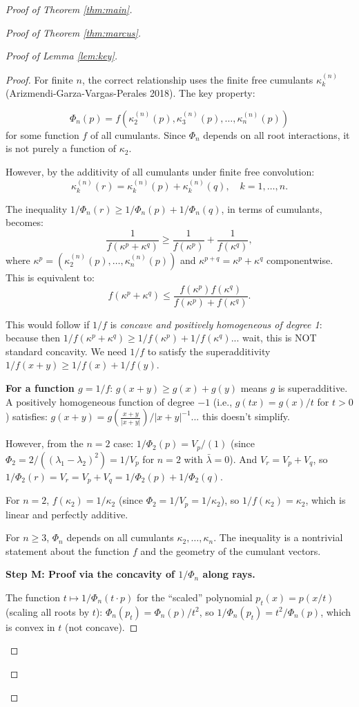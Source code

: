 \documentclass[12pt]{article}
\theoremstyle{definition}
\begin{document}
\begin{proof}[Proof of Theorem \ref{thm:main}]
\begin{proof}[Proof of Theorem \ref{thm:marcus}]
\begin{proof}[Proof of Lemma \ref{lem:key}]
\begin{proof}
For finite $n$, the correct relationship uses the finite free cumulants $\kappa_k^{(n)}$ (Arizmendi-Garza-Vargas-Perales 2018). The key property:

\begin{equation}\label{eq:cumulant-phi}
\Phi_n(p) = f(\kappa_2^{(n)}(p), \kappa_3^{(n)}(p), \ldots, \kappa_n^{(n)}(p))
\end{equation}
for some function $f$ of all cumulants. Since $\Phi_n$ depends on all root interactions, it is not purely a function of $\kappa_2$.

However, by the additivity of all cumulants under finite free convolution:
$$\kappa_k^{(n)}(r) = \kappa_k^{(n)}(p)+\kappa_k^{(n)}(q), \quad k=1,\ldots,n.$$

The inequality $1/\Phi_n(r)\geq 1/\Phi_n(p)+1/\Phi_n(q)$, in terms of cumulants, becomes:
$$\frac{1}{f(\kappa^p+\kappa^q)}\geq\frac{1}{f(\kappa^p)}+\frac{1}{f(\kappa^q)},$$
where $\kappa^p = (\kappa_2^{(n)}(p),\ldots,\kappa_n^{(n)}(p))$ and $\kappa^{p+q} = \kappa^p+\kappa^q$ componentwise. This is equivalent to:
$$f(\kappa^p+\kappa^q)\leq\frac{f(\kappa^p)f(\kappa^q)}{f(\kappa^p)+f(\kappa^q)}.$$

This would follow if $1/f$ is \emph{concave and positively homogeneous of degree 1}: because then $1/f(\kappa^p+\kappa^q)\geq 1/f(\kappa^p)+1/f(\kappa^q)$... wait, this is NOT standard concavity. We need $1/f$ to satisfy the superadditivity $1/f(x+y)\geq 1/f(x)+1/f(y)$.

\textbf{For a function $g = 1/f$}: $g(x+y)\geq g(x)+g(y)$ means $g$ is superadditive. A positively homogeneous function of degree $-1$ (i.e., $g(tx) = g(x)/t$ for $t>0$) satisfies: $g(x+y) = g(\frac{x+y}{|x+y|})/|x+y|^{-1}$... this doesn't simplify.

However, from the $n=2$ case: $1/\Phi_2(p) = V_p/(1)$ (since $\Phi_2 = 2/((\lambda_1-\lambda_2)^2) = 1/V_p$ for $n=2$ with $\bar\lambda=0$). And $V_r = V_p+V_q$, so $1/\Phi_2(r) = V_r = V_p+V_q = 1/\Phi_2(p)+1/\Phi_2(q)$.

For $n=2$, $f(\kappa_2) = 1/\kappa_2$ (since $\Phi_2 = 1/V_p = 1/\kappa_2$), so $1/f(\kappa_2) = \kappa_2$, which is linear and perfectly additive.

For $n\geq 3$, $\Phi_n$ depends on all cumulants $\kappa_2,\ldots,\kappa_n$. The inequality is a nontrivial statement about the function $f$ and the geometry of the cumulant vectors.

\textbf{Step M: Proof via the concavity of $1/\Phi_n$ along rays.}

The function $t\mapsto 1/\Phi_n(t\cdot p)$ for the ``scaled'' polynomial $p_t(x) = p(x/t)$ (scaling all roots by $t$): $\Phi_n(p_t) = \Phi_n(p)/t^2$, so $1/\Phi_n(p_t) = t^2/\Phi_n(p)$, which is convex in $t$ (not concave).


\end{proof}
\end{proof}
\end{proof}
\end{proof}
\end{document}
